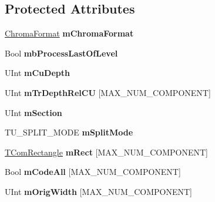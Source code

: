 \subsection*{Protected Attributes}
\begin{DoxyCompactItemize}
\item 
\mbox{\label{class_t_com_t_u_a5630f87427889845b6d9533370a603b1}} 
\hyperlink{_type_def_8h_a4a6c51c10f2eb04abc7209db7caff39f}{Chroma\+Format} {\bfseries m\+Chroma\+Format}
\item 
\mbox{\label{class_t_com_t_u_a62fbfbfd398153185c95007589590e66}} 
Bool {\bfseries mb\+Process\+Last\+Of\+Level}
\item 
\mbox{\label{class_t_com_t_u_a099df28a45e7e9546fb494906fcd5b2c}} 
U\+Int {\bfseries m\+Cu\+Depth}
\item 
\mbox{\label{class_t_com_t_u_af7157eec904ed9418bfc2b226f89619b}} 
U\+Int {\bfseries m\+Tr\+Depth\+Rel\+CU} \mbox{[}M\+A\+X\+\_\+\+N\+U\+M\+\_\+\+C\+O\+M\+P\+O\+N\+E\+NT\mbox{]}
\item 
\mbox{\label{class_t_com_t_u_a182eb1a97198f5764b7bad101a8dfe3f}} 
U\+Int {\bfseries m\+Section}
\item 
\mbox{\label{class_t_com_t_u_a4f6254b6e48963cbdbdb419c3df023c5}} 
T\+U\+\_\+\+S\+P\+L\+I\+T\+\_\+\+M\+O\+DE {\bfseries m\+Split\+Mode}
\item 
\mbox{\label{class_t_com_t_u_a23427f02ca706b668ebdef741431439f}} 
\hyperlink{struct_t_com_rectangle}{T\+Com\+Rectangle} {\bfseries m\+Rect} \mbox{[}M\+A\+X\+\_\+\+N\+U\+M\+\_\+\+C\+O\+M\+P\+O\+N\+E\+NT\mbox{]}
\item 
\mbox{\label{class_t_com_t_u_a309b34a58a2ec741f415e653448c4081}} 
Bool {\bfseries m\+Code\+All} \mbox{[}M\+A\+X\+\_\+\+N\+U\+M\+\_\+\+C\+O\+M\+P\+O\+N\+E\+NT\mbox{]}
\item 
\mbox{\label{class_t_com_t_u_a71fb12af71fd076b787a239c5a92d6f1}} 
U\+Int {\bfseries m\+Orig\+Width} \mbox{[}M\+A\+X\+\_\+\+N\+U\+M\+\_\+\+C\+O\+M\+P\+O\+N\+E\+NT\mbox{]}
\item 

\end{DoxyCompactItemize}
